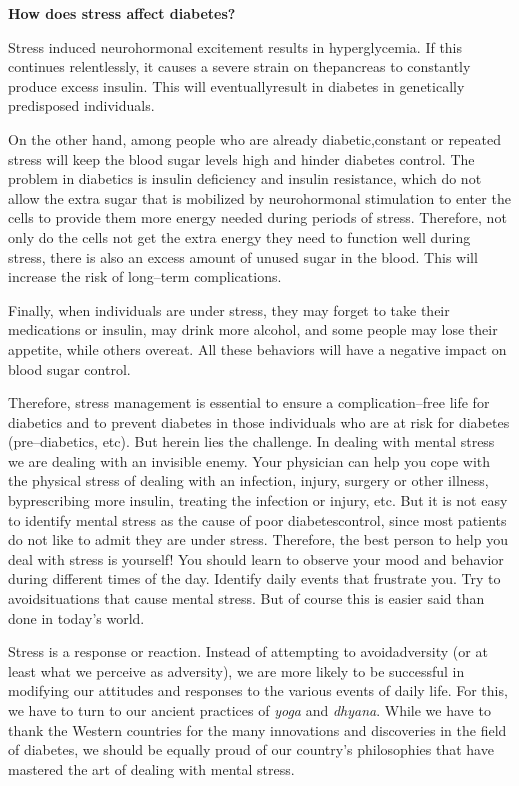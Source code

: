 \noindent\textbf{How does stress affect diabetes?}

Stress induced neurohormonal excitement results in hypergly\-ce\-mia. If this continues relentlessly, it causes a severe strain on the\break pancreas to constantly produce excess insulin. This will eventually\break result in diabetes in genetically predisposed individuals.

On the other hand, among people who are already diabetic,\break constant or repeated stress will keep the blood sugar levels high and hinder diabetes control. The problem in diabetics is insulin deficiency and insulin resistance, which do not allow the extra sugar that is mobilized by neurohormonal stimulation to enter the cells to provide them more energy needed during periods of stress. Therefore, not only do the cells not get the extra energy they need to function well during stress, there is also an excess amount of unused sugar in the blood. This will increase the risk of long–term complications.

Finally, when individuals are under stress, they may forget to take their medications or insulin, may drink more alcohol, and some people may lose their appetite, while others overeat. All these behaviors will have a negative impact on blood sugar control.

Therefore, stress management is essential to ensure a complica\-tion–free life for diabetics and to prevent diabetes in those indivi\-duals who are at risk for diabetes (pre–diabetics, etc). But herein lies the challenge. In dealing with mental stress we are dealing with an invisible enemy. Your physician can help you cope with the physical stress of dealing with an infection, injury, surgery or other illness, by\break prescribing more insulin, treating the infection or injury, etc. But it is not easy to identify mental stress as the cause of poor diabetes\break control, since most patients do not like to admit they are under stress. Therefore, the best person to help you deal with stress is yourself! You should learn to observe your mood and behavior during different times of the day. Identify daily events that frustrate you. Try to avoid\break situations that cause mental stress. But of course this is easier said than done in today’s world.

Stress is a response or reaction. Instead of attempting to avoid\break adversity (or at least what we perceive as adversity), we are more likely to be successful in modifying our attitudes and responses to the various events of daily life. For this, we have to turn to our ancient practices of \textit{yoga} and \textit{dhyana}. While we have to thank the Western countries for the many innovations and discoveries in the field of diabetes, we should be equally proud of our country’s philosophies that have mastered the art of dealing with mental stress.

